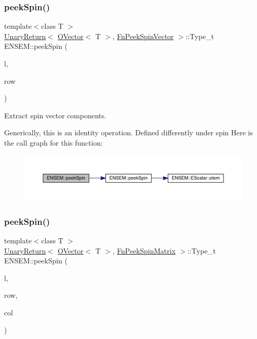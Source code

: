 \subsubsection{\texorpdfstring{peekSpin()}{peekSpin()}\hspace{0.1cm}{\footnotesize\ttfamily [1/2]}}
{\footnotesize\ttfamily template$<$class T $>$ \\
\mbox{\hyperlink{structENSEM_1_1UnaryReturn}{Unary\+Return}}$<$ \mbox{\hyperlink{classENSEM_1_1OVector}{O\+Vector}}$<$ T $>$, \mbox{\hyperlink{structENSEM_1_1FnPeekSpinVector}{Fn\+Peek\+Spin\+Vector}} $>$\+::Type\+\_\+t E\+N\+S\+E\+M\+::peek\+Spin (\begin{DoxyParamCaption}\item[{const \mbox{\hyperlink{classENSEM_1_1OVector}{O\+Vector}}$<$ T $>$ \&}]{l,  }\item[{int}]{row }\end{DoxyParamCaption})\hspace{0.3cm}{\ttfamily [inline]}}



Extract spin vector components. 

Generically, this is an identity operation. Defined differently under spin Here is the call graph for this function\+:\nopagebreak
\begin{figure}[H]
\begin{center}
\leavevmode
\includegraphics[width=350pt]{da/d59/group__obsvector_ga53ddc54421a1f3fa7ee2ed55f15627a6_cgraph}
\end{center}
\end{figure}
\mbox{\label{group__obsvector_gab454ed8a07dbd29bbb2851736c4635e6}} 
\subsubsection{\texorpdfstring{peekSpin()}{peekSpin()}\hspace{0.1cm}{\footnotesize\ttfamily [2/2]}}
{\footnotesize\ttfamily template$<$class T $>$ \\
\mbox{\hyperlink{structENSEM_1_1UnaryReturn}{Unary\+Return}}$<$ \mbox{\hyperlink{classENSEM_1_1OVector}{O\+Vector}}$<$ T $>$, \mbox{\hyperlink{structENSEM_1_1FnPeekSpinMatrix}{Fn\+Peek\+Spin\+Matrix}} $>$\+::Type\+\_\+t E\+N\+S\+E\+M\+::peek\+Spin (\begin{DoxyParamCaption}\item[{const \mbox{\hyperlink{classENSEM_1_1OVector}{O\+Vector}}$<$ T $>$ \&}]{l,  }\item[{int}]{row,  }\item[{int}]{col }\end{DoxyParamCaption})\hspace{0.3cm}{\ttfamily [inline]}}




